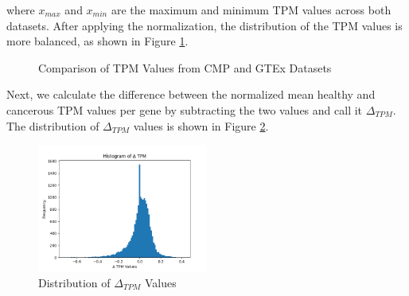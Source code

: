 where $x_{max}$ and $x_{min}$ are the maximum and minimum TPM values across both datasets.
After applying the normalization, the distribution of the TPM values is more balanced, as shown in Figure \ref{fig:03_02_normalized_tpm_both}.

\begin{figure}[h]
    \centering
    \caption{Comparison of TPM Values from CMP and GTEx Datasets}
    \hfill
    \label{fig:03_02_normalized_tpm_both}
\end{figure}



Next, we calculate the difference between the normalized mean healthy and cancerous TPM values per gene
by subtracting the two values and call it $\Delta_{TPM}$.
The distribution of $\Delta_{TPM}$ values is shown in Figure \ref{fig:03_02_delta_tpm}.

\begin{figure}[h]
\centering
\includegraphics[width=0.5\textwidth]{figures/03_02_delta_tpm}
\caption{Distribution of $\Delta_{TPM}$ Values}
\label{fig:03_02_delta_tpm}
\end{figure}


